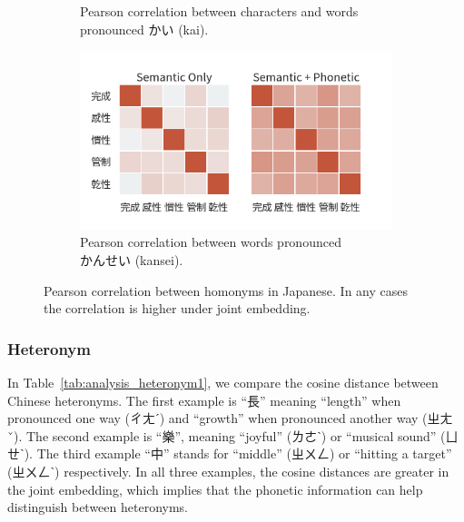 \begin{CJK}{UTF8}{ipxm}
\begin{figure}[h!]
\begin{subfigure}[b]{0.46\textwidth}
        \caption{Pearson correlation between characters and words pronounced かい (kai).}
        \label{fig:corr_ja2}
    \end{subfigure}
    \begin{subfigure}[b]{0.46\textwidth}
        \centering
        \includegraphics[width=\textwidth]{../images/corr_ja3.png}
        \caption{Pearson correlation between words pronounced \\かんせい (kansei).}
        \label{fig:corr_ja3}
    \end{subfigure}
    \caption[Pearson correlation between homonyms in Japanese]{Pearson correlation between homonyms in Japanese. In any cases the correlation is higher under joint embedding.}
    \label{fig:corr_ja}
\end{figure}
\end{CJK}

\subsubsection{Heteronym}

In Table~\ref{tab:analysis_heteronym1}, we compare the cosine distance between Chinese heteronyms.  The first example is ``長'' meaning ``length'' when pronounced one way (ㄔㄤˊ) and ``growth'' when pronounced another way (ㄓㄤˇ).  The second example is ``樂'', meaning ``joyful'' (ㄌㄜˋ) or ``musical sound'' (ㄩㄝˋ).  The third example ``中'' stands for ``middle'' (ㄓㄨㄥ) or ``hitting a target'' (ㄓㄨㄥˋ) respectively. In all three examples, the cosine distances are greater in the joint embedding, which implies that the phonetic information can help distinguish between heteronyms.

